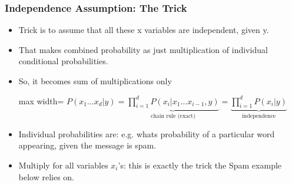 \begin{frame}[fragile]\frametitle{Independence Assumption: The Trick}
\begin{itemize}
\item Trick is to assume that all these x variables are independent, given y.
\item That makes combined probability as just multiplication of individual conditional probabilities.
\item So, it becomes sum of multiplications only
\begin{center}
\begin{adjustbox}{max width=\linewidth}
$\displaystyle P(x_1\ldots x_d|y) = \underbrace{\prod_{i=1}^{d} P(x_i|x_1\ldots x_{i-1},y)}_{\text{chain rule (exact)}} = \underbrace{\prod_{i=1}^{d} P(x_i|y)}_{\text{independence}}$
\end{adjustbox}
\end{center}
\item Individual probabilities are: e.g. whats probability of a particular word appearing, given the message is spam.
\item Multiply for all variables $x_i$'s: this is exactly the trick the Spam example below relies on.
\end{itemize}
\end{frame}

